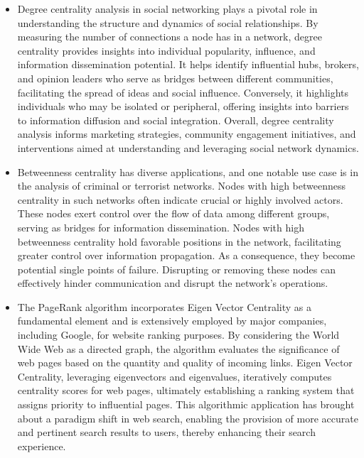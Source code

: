 \documentclass{article}
\begin{document}
\begin{itemize}

\item Degree centrality analysis in social networking plays a pivotal role in understanding the structure and dynamics of social relationships. By measuring the number of connections a node has in a network, degree centrality provides insights into individual popularity, influence, and information dissemination potential. It helps identify influential hubs, brokers, and opinion leaders who serve as bridges between different communities, facilitating the spread of ideas and social influence. Conversely, it highlights individuals who may be isolated or peripheral, offering insights into barriers to information diffusion and social integration. Overall, degree centrality analysis informs marketing strategies, community engagement initiatives, and interventions aimed at understanding and leveraging social network dynamics.

\item Betweenness centrality has diverse applications, and one notable use case is in the analysis of criminal or terrorist networks. Nodes with high betweenness centrality in such networks often indicate crucial or highly involved actors. These nodes exert control over the flow of data among different groups, serving as bridges for information dissemination. Nodes with high betweenness centrality hold favorable positions in the network, facilitating greater control over information propagation. As a consequence, they become potential single points of failure. Disrupting or removing these nodes can effectively hinder communication and disrupt the network's operations.

\item The PageRank algorithm incorporates Eigen Vector Centrality as a fundamental element and is extensively employed by major companies, including Google, for website ranking purposes. By considering the World Wide Web as a directed graph, the algorithm evaluates the significance of web pages based on the quantity and quality of incoming links. Eigen Vector Centrality, leveraging eigenvectors and eigenvalues, iteratively computes centrality scores for web pages, ultimately establishing a ranking system that assigns priority to influential pages. This algorithmic application has brought about a paradigm shift in web search, enabling the provision of more accurate and pertinent search results to users, thereby enhancing their search experience.

\end{itemize}
\end{document}
